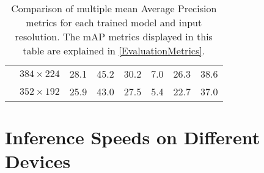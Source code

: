 \begin{table}[t]
\begin{threeparttable}
\begin{tabular}{|c|c|rrrrrr|}
            \cline{2-2}
                                        & \multirow{1}{*}{$384\times224$}  & 28.1 & 45.2 & 30.2 &  7.0 & 26.3 & 38.6 \\
            \cline{2-2}
                                        & \multirow{1}{*}{$352\times192$}  & 25.9 & 43.0 & 27.5 &  5.4 & 22.7 & 37.0 \\
            \hline
        \end{tabular}
        \caption{Comparison of multiple mean Average Precision metrics for each
        trained model and input resolution. The mAP metrics displayed in this table
        are explained in \autoref{EvaluationMetrics}.}
        \label{mAPTableSmall}
    \end{threeparttable}
\end{table}






\section{Inference Speeds on Different Devices}



